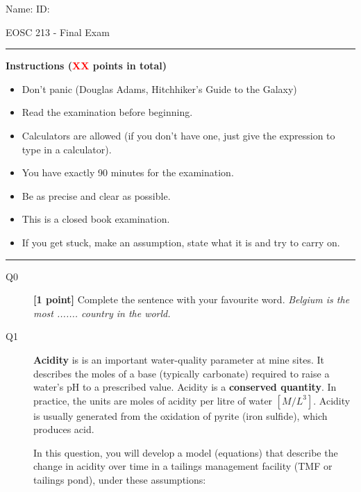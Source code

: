 \documentclass{article}
\begin{document}
\pagestyle{first}
\large{Name:} \hspace{12cm} \large{ID: }
\begin{center}
\Huge{EOSC 213 - Final Exam}
\end{center}

\rule{\textwidth}{1pt}

\large{\textbf{Instructions (\textcolor{red}{XX} points in total)}}
\begin{multicols}{2}
\begin{itemize}
\item Don't panic (Douglas Adams, Hitchhiker's Guide to the Galaxy)
\item Read the examination before beginning.
\item Calculators are allowed (if you don't have one, just give the expression to type in a calculator).
\item You have exactly 90 minutes for the examination.
\item Be as precise and clear as possible.
\item This is a closed book examination.
\item If you get stuck, make an assumption, state what it is and try to carry on.
\end{itemize} 
\end{multicols}



\rule{\textwidth}{1pt}

\begin{description}
\item [Q0]  \textbf{[1 point]} Complete the sentence with your favourite word. \textit{Belgium is the most ....... country in the world.} 
\vspace{0.25cm}

\end{description}


\begin{description}
\item[Q1] \textbf{Acidity} is is an important water-quality parameter at mine sites. It describes the moles of a base (typically carbonate) required to raise a water's pH to a prescribed value. Acidity is a \textbf{conserved quantity}. In practice, the units are moles of acidity per litre of water $[M/L^3]$. Acidity is usually generated from the oxidation of pyrite (iron sulfide), which produces acid.  


In this question, you will develop a model (equations) that describe the change in acidity over time in a tailings management facility (TMF or tailings pond), under these assumptions:
\end{description}
\end{document}
